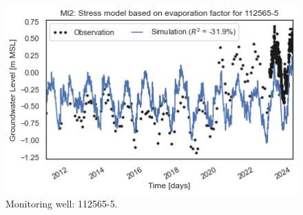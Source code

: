 \begin{figure}[htbp]
\begin{minipage}{0.32\textwidth}
        \includegraphics[width=\linewidth]{frontmatter/Rozenburg-fig/1125655.png}
        \caption{Monitoring well: 112565-5.}
        \label{fig:112565-5}
    \end{minipage}
\end{figure}

